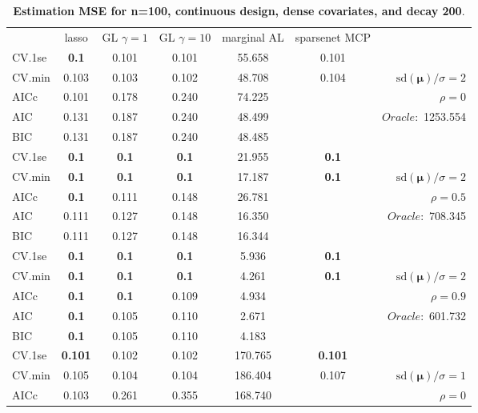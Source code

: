 



\clearpage
\begin{table}\vspace{-.5cm}
\caption[l]{ { \bf Estimation MSE for n=100, continuous design, 
dense covariates, and  decay  200}.}
\vspace{-.5cm}
\footnotesize{}
\begin{center}
\begin{tabular}{l*{5}{c}|r}
& lasso & GL $\gamma=1$ & GL $\gamma=10$ & marginal AL & sparsenet MCP  & \\
 \cline{1-7}
CV.1se & {\bf 0.1} & 0.101 & 0.101 & 55.658 & 0.101 & \\
CV.min & 0.103 & 0.103 & 0.102 & 48.708 & 0.104 &  $\mathrm{sd}(\mathbf{\mu})/\sigma=2$ \\
AICc & 0.101 & 0.178 & 0.240 & 74.225 & & $\rho=0$ \\
AIC & 0.131 & 0.187 & 0.240 & 48.499 & &  \multirow{2}{*}{$Oracle: $ 1253.554} \\
BIC & 0.131 & 0.187 & 0.240 & 48.485 & &  \\
 \hline 
CV.1se & {\bf 0.1} & {\bf 0.1} & {\bf 0.1} & 21.955 & {\bf 0.1} & \\
CV.min & {\bf 0.1} & {\bf 0.1} & {\bf 0.1} & 17.187 & {\bf 0.1} &  $\mathrm{sd}(\mathbf{\mu})/\sigma=2$ \\
AICc & {\bf 0.1} & 0.111 & 0.148 & 26.781 & & $\rho=0.5$ \\
AIC & 0.111 & 0.127 & 0.148 & 16.350 & &  \multirow{2}{*}{$Oracle: $ 708.345} \\
BIC & 0.111 & 0.127 & 0.148 & 16.344 & &  \\
 \hline 
CV.1se & {\bf 0.1} & {\bf 0.1} & {\bf 0.1} & 5.936 & {\bf 0.1} & \\
CV.min & {\bf 0.1} & {\bf 0.1} & {\bf 0.1} & 4.261 & {\bf 0.1} &  $\mathrm{sd}(\mathbf{\mu})/\sigma=2$ \\
AICc & {\bf 0.1} & {\bf 0.1} & 0.109 & 4.934 & & $\rho=0.9$ \\
AIC & {\bf 0.1} & 0.105 & 0.110 & 2.671 & &  \multirow{2}{*}{$Oracle: $ 601.732} \\
BIC & {\bf 0.1} & 0.105 & 0.110 & 4.183 & &  \\
 \hline 
CV.1se & {\bf 0.101} & 0.102 & 0.102 & 170.765 & {\bf 0.101} & \\
CV.min & 0.105 & 0.104 & 0.104 & 186.404 & 0.107 &  $\mathrm{sd}(\mathbf{\mu})/\sigma=1$ \\
AICc & 0.103 & 0.261 & 0.355 & 168.740 & & $\rho=0$ \\

\end{tabular}
\end{center}
\end{table}
